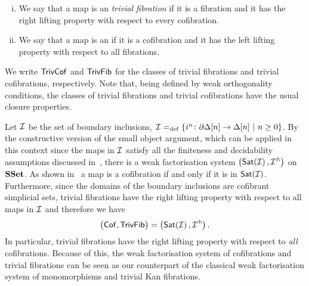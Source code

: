 \documentclass[reqno,10pt,a4paper,oneside,draft]{amsart}
\begin{document}
\begin{definition} \label{def:trivfib-trivcof} \hfill
\begin{enumerate}[(i)]
\item We say that a map is an \emph{trivial fibration} if it is a fibration and it has the right lifting property
with respect to every cofibration.
\item We say that a map is an  if it is a cofibration and it has the left lifting property with respect to all fibrations.
\end{enumerate}
\end{definition}

We write $\TrivCof$ and $\TrivFib$ for the classes of trivial fibrations and trivial cofibrations, respectively.
Note that, being defined by weak orthogonality conditions, the classes of trivial fibrations
and trivial cofibrations have the usual closure properties. 

\bigskip






\begin{remark} Let $\cal{I}$ be the set of boundary inclusions, \ie $\cal{I} \defeq \{ i^n \co  \partial \Delta[n] \to \Delta[n] \ | \ n \geq 0 \}$.  By the constructive version of the small object argument, which can be applied in this context since the 
maps in $\cal{I}$ satisfy all the finiteness and decidability assumptions discussed  in~\cite[\S 4.1.4]{henry2018wms}, there is a weak factorisation system $\big( \mathsf{Sat}(\cal{I}) \, , \cal{I}^\pitchfork \big)$
on $\SSet$. As shown in~\cite[Proposition 5.1.7]{henry2018wms} a map is a cofibration if and only if it is in $\mathsf{Sat}(\cal{I})$. Furthermore, since the domains of the boundary inclusions are cofibrant simplicial sets, trivial fibrations have the right lifting property with respect to all maps in $\cal{I}$ and therefore we have
\[
\big( \Cof, \TrivFib \big) = \big( \mathsf{Sat}(\cal{I}) \, , \cal{I}^\pitchfork \big) \, .
\]
In particular, trivial fibrations have the right lifting property with respect to \emph{all} cofibrations. Because of this, the weak factorisation system of cofibrations and trivial fibrations can be seen as our counterpart of the classical weak factorisation system of monomorphisms and trivial Kan fibrations.
\end{remark} 
\end{document}
